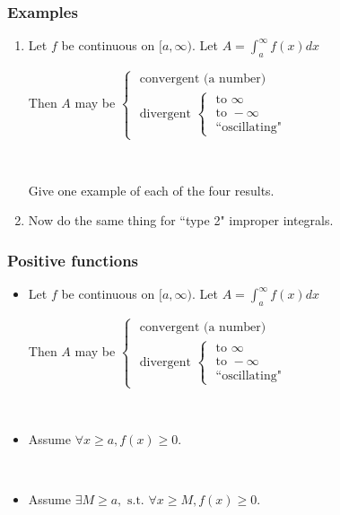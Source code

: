 \documentclass[14pt]{beamer}
\newcommand {\DS} [1] {${\displaystyle #1}$}
\newcommand{\p}{\pause}
\newcommand{\setsize}[1]{\fontsize{#1}{#1}\selectfont} %
\newcommand{\smallerfont}{\setsize{13}} %
\begin{document}
\begin{frame}[t]
\frametitle{Examples}

 \begin{enumerate}
 
 \item Let $f$ be continuous on $[a, \infty)$.   Let
			\DS{ A = \int_a^{\infty} f(x) dx }
	
		Then $A$ may be
		\DS{
			\begin{cases}
				\mbox{ convergent (a number) } \\
				\mbox{ divergent } 
					\begin{cases}
						\mbox{ to } \infty \\
						\mbox{ to } - \infty \\
						\mbox{ ``oscillating"}
					\end{cases}
			\end{cases}
		}
		
	\
	
Give one example of each of the four results.
\vfill \p

\item Now do the same thing for ``type 2" improper integrals. 

\end{enumerate}
\vfill

\end{frame}
\begin{frame}[t]
\smallerfont
\frametitle{Positive functions}

\begin{itemize}
	\item Let $f$ be continuous on $[a, \infty)$.   Let
			\DS{ A = \int_a^{\infty} f(x) dx }
	
		Then $A$ may be
		\DS{
			\begin{cases}
				\mbox{ convergent (a number) } \\
				\mbox{ divergent } 
					\begin{cases}
						\mbox{ to } \infty \\
						\mbox{ to } - \infty \\
						\mbox{ ``oscillating"}
					\end{cases}
			\end{cases}
		}
		
		\ \p		
	\item  Assume \DS{\forall x \geq a, f(x) \geq 0}.
		\vspace{.2cm}
		
		
		\ \p 
	\item  Assume \DS{\exists M \geq a, \mbox{ s.t. } \forall x \geq M, f(x) \geq 0}.
		\vspace{.2cm}
	
		
\end{itemize}

\end{frame}
\end{document}
